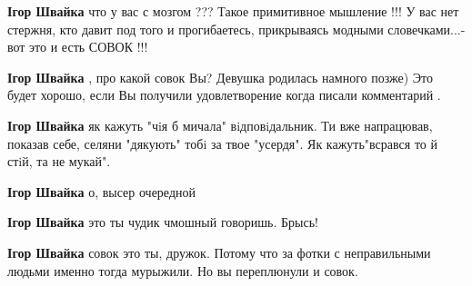 \begin{itemize}
\begin{itemize}
\textbf{Ігор Швайка} что у вас с мозгом ??? Такое примитивное мышление !!!
У вас нет стержня, кто давит под того и прогибаетесь, прикрываясь модными словечками...- вот это и есть СОВОК !!!

 
\textbf{Ігор Швайка} , про какой совок Вы? Девушка родилась намного позже)
Это будет хорошо, если Вы получили удовлетворение когда писали комментарий .

 
\textbf{Ігор Швайка} як кажуть "чiя б мичала" вiдповiдальник. Ти вже напрацював,
показав себе, селяни "дякують" тобi за твое "усердя". Як кажуть"всрався то й
стiй, та не мукай".

 
\textbf{Ігор Швайка} о, высер очередной

 
\textbf{Ігор Швайка} это ты чудик чмошный говоришь. Брысь!

 
\textbf{Ігор Швайка} совок это ты, дружок. Потому что за фотки с неправильными людьми именно тогда мурыжили. Но вы переплюнули и совок.

 

\end{itemize}
\end{itemize}
